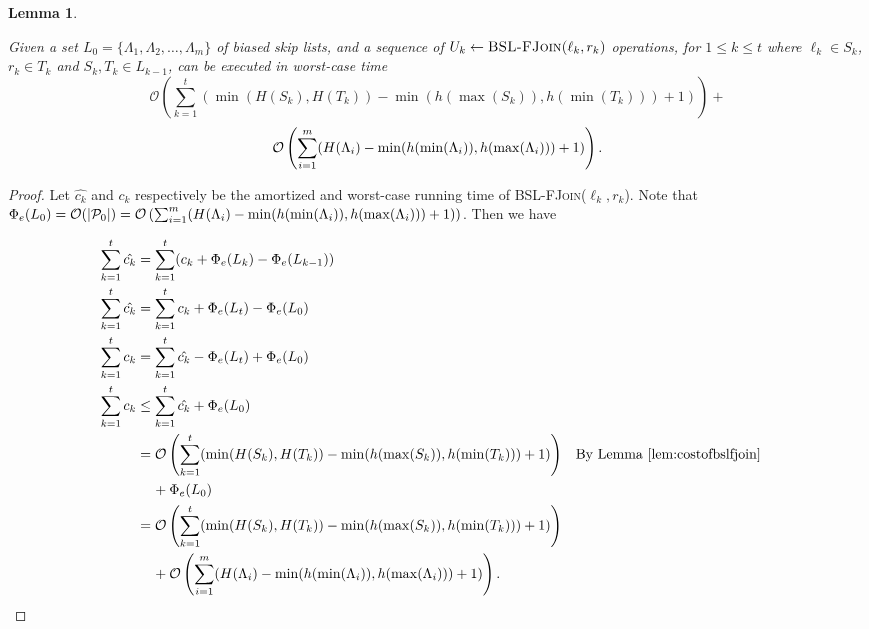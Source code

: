 \documentclass[11pt]{article}
\newcommand{\Bslfjoinx}[2]{\mbox{\textsc{BSL-FJoin(\ensuremath{#1,#2})}}}
\newcommand{\nodeheight}[1]{\ensuremath{h(#1)}}
\newcommand{\intheight}[1]{\ensuremath{H(#1)}}
\newcommand{\intmax}[1]{\ensuremath{\max(\intl #1)}}
\newcommand{\intmin}[1]{\ensuremath{\min(\intl #1)}}
\newcommand{\intl}[1]{\ensuremath{#1}}
\newcommand{\set}[1]{\ensuremath{#1}}
\newcommand{\indatast}[1]{\ensuremath{L_{#1}}}
\newcommand{\locpotfun}[1]{\ensuremath{\Phi_{e}(#1)}}
\newcommand{\plats}[1]{\ensuremath{\mathcal P_{#1}}}
\newcommand{\amcost}[1]{\ensuremath{\hat{c_{#1}}}}
\newcommand{\actcost}[1]{\ensuremath{c_{#1}}}
\newcommand{\initbsl}[1]{\ensuremath{\Lambda_{#1}}}
\newcounter{count}
\newtheorem{lemma}[count]{Lemma}
\begin{document}
\begin{lemma} 
\label{lem:wccostofbslfjoin} 

Given a set $\indatast 0=\{\initbsl 1, \initbsl 2,\ldots, \initbsl m\}$ of biased skip lists, and a sequence of $U_k \leftarrow \Bslfjoinx{\ell_k}{r_k}$ operations, for $1\leq k \leq t$ where $\ell_k\in \set S_k$, $r_k\in \set T_k$  and $\set S_k,\set T_k \in \indatast{k-1}$, can be executed in worst-case time 
\[ 
\mathcal O\left(\sum_{k=1}^t (\min(\intheight{S_k},\intheight{T_k}) - \min(\nodeheight{\intmax{S_k}},\nodeheight{\intmin{T_k}})+1)\right)+
\] 
\[\mathcal O\left(\sum_{i=1}^{m}(\intheight{\initbsl i} - \min(\nodeheight{\intmin{\initbsl i}},\nodeheight{\intmax{\initbsl i}})+1)\right). 
\] 
\end{lemma} 


\begin{proof} 
Let \amcost k and \actcost k respectively be the amortized and worst-case running time of \Bslfjoinx{\ell_k}{r_k}. Note that $\locpotfun{\indatast 0} = \mathcal O(|\plats 0|) = \mathcal O\left(\sum_{i=1}^{m}(\intheight{\initbsl i} - \min(\nodeheight{\intmin{\initbsl i}},\nodeheight{\intmax{\initbsl i}})+1)\right)$. Then we have 

{\allowdisplaybreaks 
\begin{align*} 
\sum_{k=1}^{t} \amcost{k} &= \sum_{k=1}^{t} (\actcost k + \locpotfun{\indatast k} - \locpotfun{\indatast{k-1}})\\ 
\sum_{k=1}^{t} \amcost{k} &=\sum_{k=1}^{t} \actcost k + \locpotfun{\indatast{t}} - \locpotfun{\indatast{0}}\\ 
\sum_{k=1}^{t} \actcost k &=\sum_{k=1}^{t} \amcost{k} - \locpotfun{\indatast{t}}+ \locpotfun{\indatast{0}}\\ 
\sum_{k=1}^{t} \actcost k &\leq\sum_{k=1}^{t} \amcost{k} + \locpotfun{\indatast{0}}\\ 
&= \mathcal O\left(\sum_{k=1}^t (\min(\intheight{S_k},\intheight{T_k}) - \min(\nodeheight{\intmax{S_k}},\nodeheight{\intmin{T_k}})+1)\right)&& \mbox{By Lemma}~\ref{lem:costofbslfjoin}\\ 
& \hspace{4mm} + \locpotfun{\indatast{0}}\\ 
&= \mathcal O\left(\sum_{k=1}^t (\min(\intheight{S_k},\intheight{T_k}) - \min(\nodeheight{\intmax{S_k}},\nodeheight{\intmin{T_k}})+1)\right)\\ 
& \hspace{4mm}  +\mathcal O\left(\sum_{i=1}^{m}(\intheight{\initbsl i} - \min(\nodeheight{\intmin{\initbsl i}},\nodeheight{\intmax{\initbsl i}})+1)\right).
\end{align*} 
} 
\end{proof} 
\end{document}
